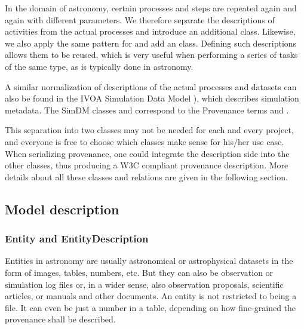 In the domain of astronomy, certain processes and steps are repeated again and 
again with different parameters. We therefore separate the descriptions of activities
from the actual processes and introduce an additional  class.
Likewise, we also apply the same pattern for  and add an 
class.
Defining such descriptions allows them to be reused, which is very useful 
when performing a series of tasks of the same type, as is typically done in 
astronomy. 

A similar normalization of descriptions of the actual processes and datasets 
can also be found in the IVOA Simulation Data Model \citep[SimDM, ][]{std:SimDM}), 
which describes simulation metadata. The SimDM classes  and  
correspond to the Provenance terms  and .


This separation into two classes may not be needed for each and every project,
and everyone is free to choose which classes make sense for his/her use case.
When serializing provenance, one could integrate the description side into the 
other classes, thus producing a W3C compliant provenance description. More details about 
all these classes and relations are given in the following section.





\subsection{Model description}
\subsubsection{Entity and EntityDescription}
Entities in astronomy are usually astronomical or astrophysical datasets in the 
form of images, tables, numbers, etc. But they can also be observation or 
simulation log files or, in a wider sense, also observation proposals, scientific 
articles, or manuals and other documents. An entity is not restricted to being
a file. 
It can even be just a number in a table, depending on how fine-grained the 
provenance shall be described.

